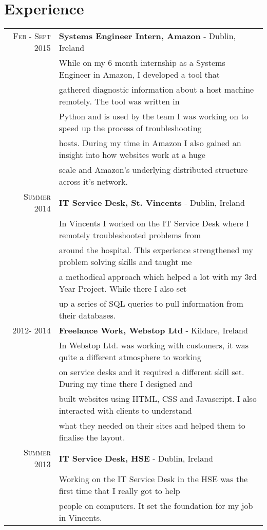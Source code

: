 \documentclass[10pt, letterpaper]{article}
\begin{document}
\section{Experience}
\begin{tabular}{rl}	
 \textsc{Feb - Sept} 2015 & \textbf{Systems Engineer Intern, Amazon} - Dublin, Ireland\\
& While on my 6 month internship as a Systems Engineer in Amazon, I developed a tool that\\
& gathered diagnostic information about a host machine remotely. The tool was written in\\
& Python and is used by the team I was working on to speed up the process of troubleshooting\\
& hosts. During my time in Amazon I also gained an insight into how websites work at a huge\\
& scale and Amazon's underlying distributed structure across it's network.\\
\textsc{Summer} 2014 & \textbf{IT Service Desk, St. Vincents} - Dublin, Ireland\\
& In Vincents I worked on the IT Service Desk where I remotely troubleshooted problems from\\ 
& around the hospital. This experience strengthened my problem solving skills and taught me\\ 
& a methodical approach which helped a lot with my 3rd Year Project. While there I also set\\
& up a series of SQL queries to pull information from their databases. \\
\textsc{2012-} 2014 & \textbf{Freelance Work, Webstop Ltd} - Kildare, Ireland\\
& In Webstop Ltd. was working with customers, it was quite a different atmosphere to working\\ 
& on service desks and it required a different skill set. During my time there I designed and \\
& built websites using HTML, CSS and Javascript. I also interacted with clients to understand\\
& what they needed on their sites and helped them to finalise the layout.\\
\textsc{Summer} 2013 & \textbf{IT Service Desk, HSE} - Dublin, Ireland \\
& Working on the IT Service Desk in the HSE was the first time that I really got to help\\
& people on computers. It set the foundation for my job in Vincents. \\
\end{tabular}
\end{document}
